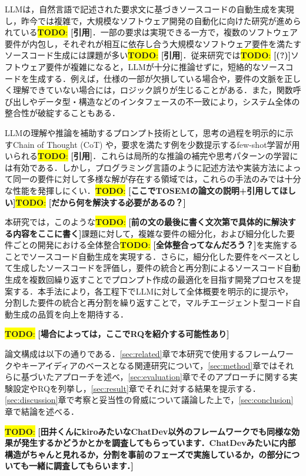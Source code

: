 \documentclass[submit,techrep,noauthor]{ipsj}
\newcommand{\todo}[1]{\colorbox{yellow}{{\bf TODO}:}{\color{red} {\textbf{[#1]}}}}
\begin{document}
LLMは，自然言語で記述された要求文に基づきソースコードの自動生成を実現し，昨今では複雑で，大規模なソフトウェア開発の自動化に向けた研究が進められている\todo{引用}．一部の要求は実現できる一方で，複数のソフトウェア要件が内包し，それぞれが相互に依存し合う大規模なソフトウェア要件を満たすソースコード生成には課題が多い\todo{引用}．従来研究では\todo{(?)}ソフトウェア要件が複雑になると，LLMが十分に推論せずに，短絡的なソースコードを生成する．例えば，仕様の一部が欠損している場合や，要件の文脈を正しく理解できていない場合には，ロジック誤りが生じることがある．また，関数呼び出しやデータ型・構造などのインタフェースの不一致により，システム全体の整合性が破綻することもある．

LLMの理解や推論を補助するプロンプト技術として，思考の過程を明示的に示すChain of Thought (CoT) や，要求を満たす例を少数提示するfew-shot学習が用いられる\todo{引用}．これらは局所的な推論の補完や思考パターンの学習には有効である．しかし，プログラミング言語のように記述方法や実装方法によって同一の要件に対して多様な解が存在する領域では，これらの手法のみでは十分な性能を発揮しにくい．\todo{ここでTOSEMの論文の説明+引用してほしい}\todo{だから何を解決する必要があるの？}

本研究では，このような\todo{前の文の最後に書く文次第で具体的に解決する内容をここに書く}課題に対して，複雑な要件の細分化，および細分化した要件ごとの開発における全体整合\todo{全体整合ってなんだろう？}を実施することでソースコード自動生成を実現する．さらに，細分化した要件をベースとして生成したソースコードを評価し，要件の統合と再分割によるソースコード自動生成を複数回繰り返すことでプロンプト作成の最適化を目指す開発プロセスを提案する．本手法により，各工程下でLLMに対して全体概要を明示的に提示や，分割した要件の統合と再分割を繰り返すことで，マルチエージェント型コード自動生成の品質を向上を期待する．

\todo{場合によっては，ここでRQを紹介する可能性あり}

論文構成は以下の通りである．\ref{sec:related}章で本研究で使用するフレームワークやキーアイディアのベースとなる関連研究について，\ref{sec:method}章ではそれらに基づいたアプローチを述べ，\ref{sec:evaluation}章でそのアプローチに関する実験設定やRQを列挙し，\ref{sec:result}章でそれに対する結果を提示する．\ref{sec:discussion}章で考察と妥当性の脅威について議論した上で，\ref{sec:conclusion}章で結論を述べる．

\todo{田井くんにkiroみたいなChatDev以外のフレームワークでも同様な効果が発生するかどうかとかを調査してもらっています．ChatDevみたいに内部構造がちゃんと見れるか，分割を事前のフェーズで実施しているか，の部分についても一緒に調査してもらいます．}
\end{document}
